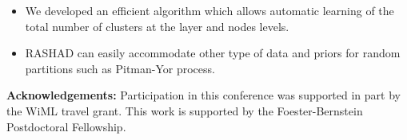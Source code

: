 \documentclass[a1,portrait,final]{a0poster}
\newenvironment{poster}{
  \begin{center}
  \begin{minipage}[c]{0.98\textwidth}
}{
  \end{minipage}
  \end{center}
}
\newcommand{\pbox}[4]{
\psshadowbox[#3]{
\begin{minipage}[t][#2][t]{#1}
#4
\end{minipage}
}}
\begin{document}
\begin{poster}
\begin{multicols}{2}
\begin{itemize}
\item We developed an efficient algorithm which allows automatic learning of the total number of clusters at the layer and nodes levels.
\item RASHAD can easily accommodate other type of data and priors for random partitions such as Pitman-Yor process.
\end{itemize}

{\small{\bf Acknowledgements:} Participation in this conference was supported in part by the WiML travel grant. This work is supported by the Foester-Bernstein Postdoctoral Fellowship.}

%
%



\end{multicols}
\end{poster}
\end{document}
